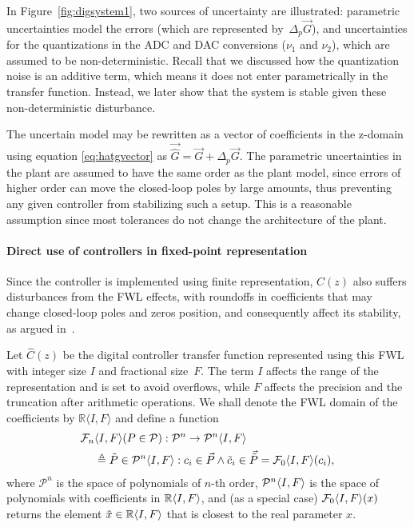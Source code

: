 \documentclass[final]{sig-alternate-05-2015}
\begin{document}
In Figure~\ref{fig:digsystem1}, two sources of uncertainty are illustrated:
parametric uncertainties model the errors (which are represented
by~$\Delta_p \vec{G}$), and uncertainties for the quantizations in the ADC
and DAC conversions ($\nu_1$ and $\nu_2$), which are assumed to be
non-deterministic.  Recall that we discussed how the quantization noise is
an additive term, which means it does not enter parametrically in the
transfer function.  Instead, we later show that the system is stable given
these non-deterministic disturbance.

The uncertain model may be rewritten as a vector of coefficients in the
z-domain using equation \eqref{eq:hatgvector} as
$\vec{\hat{G}}=\vec{G}+\Delta_p \vec{G}$.  The parametric uncertainties in
the plant are assumed to have the same order as the plant model, since
errors of higher order can move the closed-loop poles by large amounts, thus
preventing any given controller from stabilizing such a setup.  This is a
reasonable assumption since most tolerances do not change the architecture
of the plant.

\smallskip

\paragraph{Direct use of controllers in fixed-point representation}

Since the controller is implemented using finite representation, $C(z)$ also
suffers disturbances from the FWL effects, with roundoffs in coefficients
that may change closed-loop poles and zeros position, and consequently
affect its stability, as argued in~\cite{Bessa16}.

Let $\hat{C}(z)$ be the digital controller transfer function represented
using this FWL with integer size $I$ and fractional size~$F$. 
The term $I$ affects the range of the representation and is set to avoid overflows, 
while $F$ affects the precision and the truncation after arithmetic operations. 
We shall denote the FWL domain of the coefficients by $\mathbb{R}\langle I,F
\rangle$ and define a function
\begin{align}
\small
\mathcal{F}_n&\param{I}{F}(P \in \mathcal{P}):\mathcal{P}^{n}\rightarrow \mathcal{P}^{n}\param{I}{F} \\
&\triangleq \tilde P \in \mathcal{P}^{n}\param{I}{F} : c_i \in \vec{P} \wedge \tilde c_i \in \vec{\tilde{P}}=\mathcal{F}_0\param{I}{F}(c_i),  \nonumber
\end{align}
%
where $\mathcal{P}^{n}$ is the space of polynomials of $n$-th order,
$\mathcal{P}^{n}\langle{I},{F}\rangle$ is the space of polynomials with coefficients
in $\mathbb{R}\langle{I},{F}\rangle$, and (as a special case)
$\mathcal{F}_0\langle{I},{F}\rangle(x)$ returns the element $\tilde{x} \in
\mathbb{R}\langle{I},{F}\rangle$ that is closest to the real parameter $x$.
\end{document}
